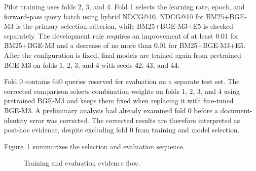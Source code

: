 Pilot training uses folds 2, 3, and 4. Fold 1 selects the learning rate, epoch, and forward-pass query batch using hybrid NDCG@10. NDCG@10 for BM25+BGE-M3 is the primary selection criterion, while BM25+BGE-M3+E5 is checked separately. The development rule requires an improvement of at least 0.01 for BM25+BGE-M3 and a decrease of no more than 0.01 for BM25+BGE-M3+E5. After the configuration is fixed, final models are trained again from pretrained BGE-M3 on folds 1, 2, 3, and 4 with seeds 42, 43, and 44.

Fold 0 contains 640 queries reserved for evaluation on a separate test set. The corrected comparison selects combination weights on folds 1, 2, 3, and 4 using pretrained BGE-M3 and keeps them fixed when replacing it with fine-tuned BGE-M3. A preliminary analysis had already examined fold 0 before a document-identity error was corrected. The corrected results are therefore interpreted as post-hoc evidence, despite excluding fold 0 from training and model selection.

Figure~\ref{fig:4.3} summarizes the selection and evaluation sequence.

\begin{figure}[p]
\centering
{}
\caption[Training and evaluation evidence flow.]{Training and evaluation evidence flow.}
\label{fig:4.3}
\end{figure}

